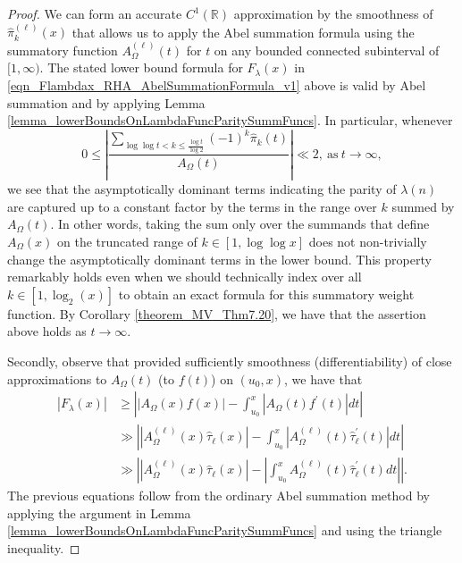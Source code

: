 \documentclass[11pt,reqno,a4letter]{article}
\numberwithin{figure}{section}
\numberwithin{table}{section}
\theoremstyle{plain}
\numberwithin{theorem}{section}
\theoremstyle{definition}
\begin{document}
\begin{proof} 
We can form an accurate $C^{1}(\mathbb{R})$ approximation by the smoothness of 
$\widehat{\pi}_k^{(\ell)}(x)$ that allows us to apply the Abel summation formula using the summatory 
function $A_{\Omega}^{(\ell)}(t)$ for $t$ on any bounded connected subinterval of $[1, \infty)$. 
The stated lower bound formula for $F_{\lambda}(x)$ in 
\eqref{eqn_Flambdax_RHA_AbelSummationFormula_v1} 
above is valid by Abel summation and by 
applying Lemma \ref{lemma_lowerBoundsOnLambdaFuncParitySummFuncs}. 
In particular, whenever 
\[
0 \leq \left\lvert \frac{\displaystyle\sum\limits_{\log\log t < k \leq \frac{\log t}{\log 2}} 
     (-1)^k \widehat{\pi}_k(t)}{A_{\Omega}(t)}\right\rvert \ll 2, 
     \mathrm{\ as\ } t \rightarrow \infty, 
\]
we see that the asymptotically dominant terms indicating the parity of 
$\lambda(n)$ are captured up to a constant factor 
by the terms in the range over $k$ summed by $A_{\Omega}(t)$. 
In other words, taking the sum only over the summands that define 
$A_{\Omega}(x)$ on the truncated range of 
$k \in [1, \log\log x]$ does not non-trivially change the asymptotically 
dominant terms in the lower bound. 
This property remarkably holds even when we should technically 
index over all $k \in [1, \log_2(x)]$ to obtain an exact formula for this 
summatory weight function.  
By Corollary \ref{theorem_MV_Thm7.20}, we have that 
the assertion above holds as $t \rightarrow \infty$. 

Secondly, observe that provided sufficiently smoothness (differentiability) of 
close approximations to $A_{\Omega}(t)$ (to $f(t)$) on $(u_0, x)$, we have that 
\begin{align*} 
|F_{\lambda}(x)| & \geq \left\lvert |A_{\Omega}(x) f(x)| - \int_{u_0}^{x} 
     |A_{\Omega}(t) f^{\prime}(t)| dt \right\rvert \\ 
     & \gg \left\lvert \left\lvert A_{\Omega}^{(\ell)} (x) \widehat{\tau}_{\ell}(x) \right\rvert - 
     \int_{u_0}^{x} 
     \left\lvert A_{\Omega}^{(\ell)}(t) \widehat{\tau}_{\ell}^{\prime}(t) 
     \right\rvert dt \right\rvert \\ 
     & \gg \left\lvert \left\lvert A_{\Omega}^{(\ell)} (x) \widehat{\tau}_{\ell}(x) \right\rvert - 
     \left\lvert \int_{u_0}^{x} 
     A_{\Omega}^{(\ell)}(t) \widehat{\tau}_{\ell}^{\prime}(t) dt \right\rvert \right\rvert. 
\end{align*} 
The previous equations follow from the ordinary Abel summation method by 
applying the argument in 
Lemma \ref{lemma_lowerBoundsOnLambdaFuncParitySummFuncs} and using the triangle inequality. 
\end{proof} 
\end{document}
